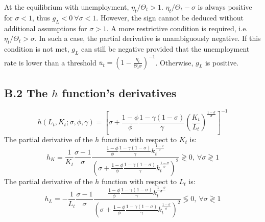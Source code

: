 At the equilibrium with unemployment, $\eta_t/\Theta_t > 1$. $\eta_t/\Theta_t -\sigma$ is always positive for $\sigma < 1$, thus $g_L < 0~\forall \sigma < 1$. However, the sign cannot be deduced without additional assumptions for $\sigma > 1$. A more restrictive condition is required, i.e. $\eta_t/\Theta_t > \sigma$. In such a case, the partial derivative is unambiguously negative. If this condition is not met, $g_L$ can still be negative provided that the unemployment rate is lower than a threshold $\bar{u}_t = \left(1 - \frac{\eta_t}{\Theta_t \sigma}\right)^{-1}$. Otherwise, $g_L$ is positive.

\subsection*{B.2 The $h$ function's derivatives}

	\begin{equation*}
		h(L_t, K_t; \sigma, \phi, \gamma) = \left[ \sigma + \frac{1-\phi}{\phi} \frac{1-\gamma(1-\sigma)}{\gamma} \left(\frac{K_t}{L_t}\right)^{\frac{1-\sigma}{\sigma}} \right]^{-1}
	\end{equation*}
The partial derivative of the $h$ function with respect to $K_t$ is:
	\begin{equation*}
		h_K = \frac{1}{K_t}\frac{\sigma-1}{\sigma}\frac{\frac{1-\phi}{\phi}\frac{1-\gamma(1-\sigma)}{\gamma}k_t^{\frac{1-\sigma}{\sigma}}}{\left(\sigma + \frac{1-\phi}{\phi}\frac{1-\gamma(1-\sigma)}{\gamma}k_t^{\frac{1-\sigma}{\sigma}}\right)^2} \gtrless 0,~\forall \sigma \gtrless 1
	\end{equation*}
The partial derivative of the $h$ function with respect to $L_t$ is:
	\begin{equation*}
		h_L = -\frac{1}{L_t}\frac{\sigma-1}{\sigma}\frac{\frac{1-\phi}{\phi}\frac{1-\gamma(1-\sigma)}{\gamma}k_t^{\frac{1-\sigma}{\sigma}}}{\left(\sigma + \frac{1-\phi}{\phi}\frac{1-\gamma(1-\sigma)}{\gamma}k_t^{\frac{1-\sigma}{\sigma}}\right)^2} \lessgtr 0,~\forall \sigma \gtrless 1
	\end{equation*}




